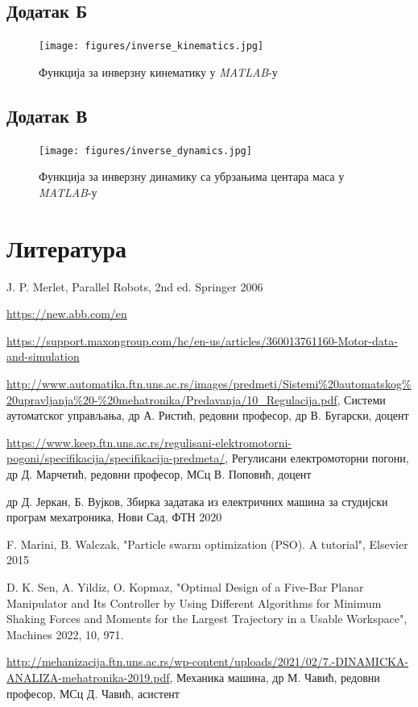 \documentclass[12pt]{article}
\begin{document}
\subsection{Додатак Б}
\begin{figure}[H]
    \raggedright
    \texttt{[image: figures/inverse\_kinematics.jpg]}
    \caption{Функција за инверзну кинематику у \textit{MATLAB}-у}
    \label{fig:inverzna_kinematika_matlab}
\end{figure}
\subsection{Додатак В}
\begin{figure}[H]
    \raggedright
    \texttt{[image: figures/inverse\_dynamics.jpg]}
    \caption{Функција за инверзну динамику са убрзањима центара маса у \textit{MATLAB}-у}
    \label{fig:inverzna_dinamika_matlab}
\end{figure}

\newpage
\section{Литература}
\begin{enumerate}[start=1,label={[\arabic*]}]
\item J. P. Merlet, Parallel Robots, 2nd ed. Springer 2006
\item \url{https://new.abb.com/en}
\item \url{https://support.maxongroup.com/hc/en-us/articles/360013761160-Motor-data-and-simulation}
\item \url{http://www.automatika.ftn.uns.ac.rs/images/predmeti/Sistemi%20automatskog%20upravljanja%20-%20mehatronika/Predavanja/10_Regulacija.pdf}, Системи аутоматског управљања,
др А. Ристић, редовни професор, др В. Бугарски, доцент
\item \url{https://www.keep.ftn.uns.ac.rs/regulisani-elektromotorni-pogoni/specifikacija/specifikacija-predmeta/}, Регулисани електромоторни погони, др Д. Марчетић, редовни професор, МСц В. Поповић, доцент
\item др Д. Јеркан, Б. Вујков, Збирка задатака из електричних машина за студијски програм мехатроника, Нови Сад, ФТН 2020
\item F. Marini, B. Walczak, "Particle swarm optimization (PSO). A tutorial", Elsevier 2015
\item D. K. Sen, A. Yildiz, O. Kopmaz, "Optimal Design of a Five-Bar Planar Manipulator and Its
Controller by Using Different Algorithms for Minimum
Shaking Forces and Moments for the Largest Trajectory in a
Usable Workspace", Machines 2022, 10, 971.
\item \url{http://mehanizacija.ftn.uns.ac.rs/wp-content/uploads/2021/02/7.-DINAMICKA-ANALIZA-mehatronika-2019.pdf}, Механика машина, др М. Чавић, редовни професор, МСц Д. Чавић, асистент
\end{enumerate}
\end{document}
